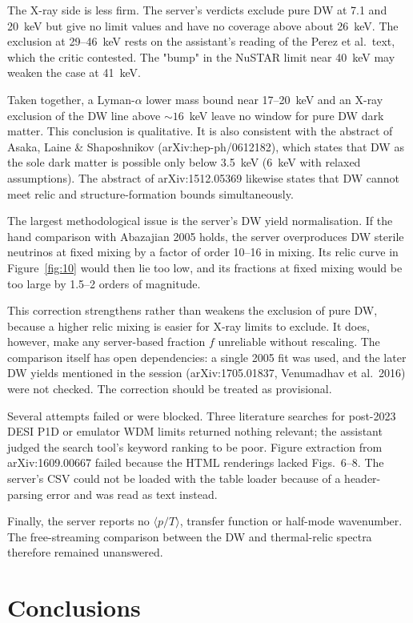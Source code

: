 \documentclass[11pt,a4paper]{article}
\begin{document}
The X-ray side is less firm. The server's verdicts exclude pure DW at 7.1 and 20~keV but give no limit values and have no coverage above about 26~keV. The exclusion at 29--46~keV rests on the assistant's reading of the Perez et al.\ text, which the critic contested. The "bump" in the NuSTAR limit near 40~keV may weaken the case at 41~keV.

Taken together, a Lyman-$\alpha$ lower mass bound near 17--20~keV and an X-ray exclusion of the DW line above $\sim16$~keV leave no window for pure DW dark matter. This conclusion is qualitative. It is also consistent with the abstract of Asaka, Laine \& Shaposhnikov (arXiv:hep-ph/0612182), which states that DW as the sole dark matter is possible only below 3.5~keV (6~keV with relaxed assumptions). The abstract of arXiv:1512.05369 likewise states that DW cannot meet relic and structure-formation bounds simultaneously.

The largest methodological issue is the server's DW yield normalisation. If the hand comparison with Abazajian 2005 holds, the server overproduces DW sterile neutrinos at fixed mixing by a factor of order 10--16 in mixing. Its relic curve in Figure~\ref{fig:10} would then lie too low, and its fractions at fixed mixing would be too large by 1.5--2 orders of magnitude.

This correction strengthens rather than weakens the exclusion of pure DW, because a higher relic mixing is easier for X-ray limits to exclude. It does, however, make any server-based fraction $f$ unreliable without rescaling. The comparison itself has open dependencies: a single 2005 fit was used, and the later DW yields mentioned in the session (arXiv:1705.01837, Venumadhav et al.\ 2016) were not checked. The correction should be treated as provisional.

Several attempts failed or were blocked. Three literature searches for post-2023 DESI P1D or emulator WDM limits returned nothing relevant; the assistant judged the search tool's keyword ranking to be poor. Figure extraction from arXiv:1609.00667 failed because the HTML renderings lacked Figs.~6--8. The server's CSV could not be loaded with the table loader because of a header-parsing error and was read as text instead.

Finally, the server reports no $\langle p/T\rangle$, transfer function or half-mode wavenumber. The free-streaming comparison between the DW and thermal-relic spectra therefore remained unanswered.

\section{Conclusions}
\end{document}
